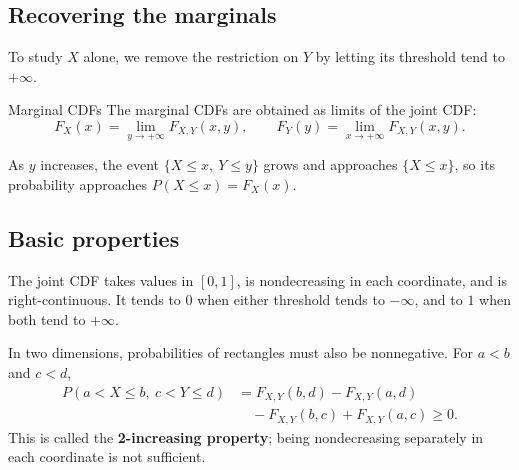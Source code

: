 \documentclass[a4paper,12pt,oneside]{report}
\begin{document}
\begin{center}
\end{center}

\subsection{Recovering the marginals}
\label{sec:marginal-cdf}

To study $X$ alone, we remove the restriction on $Y$ by letting
its threshold tend to $+\infty$.

\begin{framedprop}{Marginal CDFs}
\label{prop:marginal-cdfs}
The marginal CDFs are obtained as limits of the joint CDF:
\[
  F_X(x)=\lim_{y\to+\infty}F_{X,Y}(x,y),
  \qquad
  F_Y(y)=\lim_{x\to+\infty}F_{X,Y}(x,y).
\]
\end{framedprop}

As $y$ increases, the event $\{X\leq x,\ Y\leq y\}$ grows and
approaches $\{X\leq x\}$, so its probability approaches
$P(X\leq x)=F_X(x)$.

\subsection{Basic properties}
The joint CDF takes values in $[0,1]$, is nondecreasing in each
coordinate, and is right-continuous. It tends to $0$ when either
threshold tends to $-\infty$, and to $1$ when both tend to $+\infty$.

In two dimensions, probabilities of rectangles must also be
nonnegative. For $a<b$ and $c<d$,
\begin{align*}
  P(a<X\leq b,\ c<Y\leq d)
    &=F_{X,Y}(b,d)-F_{X,Y}(a,d)\\
    &\quad-F_{X,Y}(b,c)+F_{X,Y}(a,c)\geq0.
\end{align*}
This is called the \textbf{2-increasing property}; being
nondecreasing separately in each coordinate is not sufficient.
\end{document}
